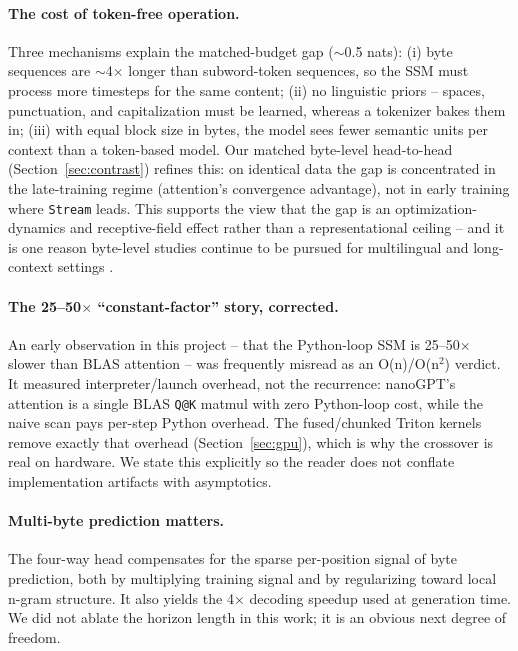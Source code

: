 \documentclass[11pt]{article}
\newcommand{\Stream}{\texttt{Stream}}
\begin{document}
\paragraph{The cost of token-free operation.}
Three mechanisms explain the matched-budget gap ($\sim$0.5 nats): (i) byte
sequences are $\sim$4$\times$ longer than subword-token sequences, so the SSM
must process more timesteps for the same content; (ii) no linguistic priors --
spaces, punctuation, and capitalization must be learned, whereas a tokenizer
bakes them in; (iii) with equal block size in bytes, the model sees fewer
semantic units per context than a token-based model. Our matched byte-level
head-to-head (Section~\ref{sec:contrast}) refines this: on identical data the
gap is concentrated in the late-training regime (attention's convergence
advantage), not in early training where \Stream{} leads. This supports the view
that the gap is an optimization-dynamics and receptive-field effect rather than
a representational ceiling -- and it is one reason byte-level studies continue
to be pursued for multilingual and long-context settings
\cite{Wang2024MambaByte,Xue2021ByT5}.

\paragraph{The 25--50$\times$ ``constant-factor'' story, corrected.}
An early observation in this project -- that the Python-loop SSM is 25--50$\times$
slower than BLAS attention -- was frequently misread as an O(n)/O(n$^2$) verdict.
It measured interpreter/launch overhead, not the recurrence: nanoGPT's attention
is a single BLAS \texttt{Q@K} matmul with zero Python-loop cost, while the naive
scan pays per-step Python overhead. The fused/chunked Triton kernels remove
exactly that overhead (Section~\ref{sec:gpu}), which is why the crossover is
real on hardware. We state this explicitly so the reader does not conflate
implementation artifacts with asymptotics.

\paragraph{Multi-byte prediction matters.}
The four-way head compensates for the sparse per-position signal of byte
prediction, both by multiplying training signal and by regularizing toward local
n-gram structure. It also yields the 4$\times$ decoding speedup used at
generation time. We did not ablate the horizon length in this work; it is an
obvious next degree of freedom.
\end{document}
